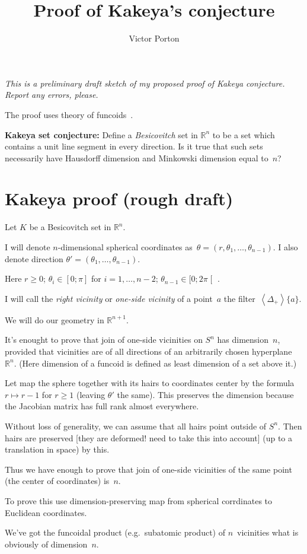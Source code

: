 \documentclass{amsart}
\title{Proof of Kakeya's conjecture}
\author{Victor Porton}
\newcommand{\supfun}[1]{\left\langle#1\right\rangle}
\begin{document}
\maketitle  

\emph{This is a preliminary draft sketch of my proposed proof of Kakeya conjecture. Report any errors, please.}

The proof uses theory of funcoids~\cite{volume-1}.

\textbf{Kakeya set conjecture:} Define a \emph{Besicovitch} set in $\mathbb{R}^n$ to be a set which contains a unit line segment in every direction. Is it true that such sets necessarily have Hausdorff dimension and Minkowski dimension equal to~$n$?

\section{Kakeya proof (rough draft)}

Let $K$ be a Besicovitch set in $\mathbb{R}^n$.

I will denote $n$-dimensional spherical coordinates as~$\theta=(r, \theta_1,\dots,\theta_{n-1})$.
I also denote direction $\theta'=(\theta_1,\dots,\theta_{n-1})$.

Here $r\geq 0$; $\theta_i\in[0;\pi]$ for $i=1,\dots,n-2$; $\theta_{n-1}\in[0;2\pi\mathclose[$ .

I will call the \emph{right vicinity} or \emph{one-si\-de vicinity} of a point~$a$ the filter~$\supfun{\Delta_{+}}\{a\}$.

We will do our geometry in $\mathbb{R}^{n+1}$.

It's enought to prove that join of one-si\-de vicinities on $S^n$ has dimension~$n$, provided that vicinities are of all directions
of an arbitrarily chosen hyperplane~$\mathbb{R}^n$.
(Here dimension of a funcoid is defined as least dimension of a set above it.)

Let map the sphere together with its hairs to coordinates center by the formula $r\mapsto r-1$ for $r\geq 1$ (leaving $\theta'$ the same).
This preserves the dimension because the Jacobian matrix has full rank almost everywhere.

Without loss of generality, we can assume that all hairs point outside of $S^n$. Then hairs are preserved [they are deformed! need to take this into account] (up to a translation in space) by this.

Thus we have enough to prove that join of one-si\-de vicinities of the same point (the center of coordinates) is~$n$.

To prove this use di\-men\-si\-on-pre\-ser\-ving map from spherical corrdinates to Euclidean coordinates.

We've got the funcoidal product (e.g.\ subatomic product) of $n$\ vicinities what is obviously of dimension~$n$.



\end{document}
